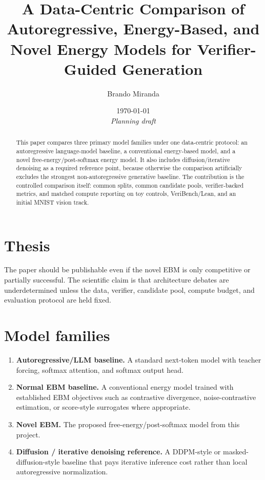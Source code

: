 \documentclass[11pt]{article}
\title{A Data-Centric Comparison of Autoregressive, Energy-Based, and Novel Energy Models for Verifier-Guided Generation}
\author{Brando Miranda}
\date{\today \\ \emph{Planning draft}}
\begin{document}
\maketitle

\begin{abstract}
This paper compares three primary model families under one data-centric protocol:
an autoregressive language-model baseline, a conventional energy-based model,
and a novel free-energy/post-softmax energy model.
It also includes diffusion/iterative denoising as a required reference point,
because otherwise the comparison artificially excludes the strongest
non-autoregressive generative baseline.
The contribution is the controlled comparison itself: common splits, common
candidate pools, verifier-backed metrics, and matched compute reporting on toy
controls, VeriBench/Lean, and an initial MNIST vision track.
\end{abstract}

\section{Thesis}

The paper should be publishable even if the novel EBM is only competitive or
partially successful.
The scientific claim is that architecture debates are underdetermined unless the
data, verifier, candidate pool, compute budget, and evaluation protocol are held
fixed.

\section{Model families}

\begin{enumerate}[leftmargin=2em]
  \item \textbf{Autoregressive/LLM baseline.}
        A standard next-token model with teacher forcing, softmax attention, and
        softmax output head.
  \item \textbf{Normal EBM baseline.}
        A conventional energy model trained with established EBM objectives such
        as contrastive divergence, noise-contrastive estimation, or score-style
        surrogates where appropriate.
  \item \textbf{Novel EBM.}
        The proposed free-energy/post-softmax model from this project.
  \item \textbf{Diffusion / iterative denoising reference.}
        A DDPM-style or masked-diffusion-style baseline that pays iterative
        inference cost rather than local autoregressive normalization.
\end{enumerate}
\end{document}
